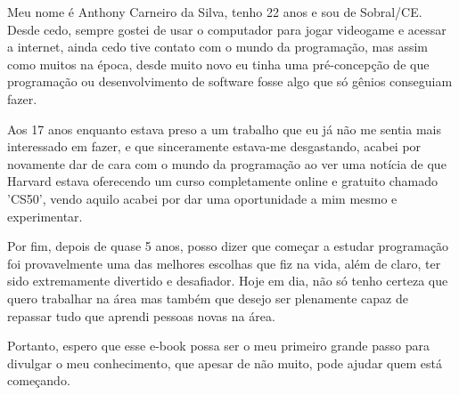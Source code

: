 
Meu nome é Anthony Carneiro da Silva, tenho 22 anos e sou de 
Sobral/CE. Desde cedo, sempre gostei de usar o computador para jogar 
videogame e acessar a internet, ainda cedo tive contato com o mundo 
da programação, mas assim como muitos na época, desde muito novo eu tinha 
uma pré-concepção de que programação ou desenvolvimento de software fosse 
algo que só gênios conseguiam fazer.

Aos 17 anos enquanto estava preso a um trabalho que eu já não me sentia 
mais interessado em fazer, e que sinceramente estava-me desgastando, acabei 
por novamente dar de cara com o mundo da programação ao ver uma notícia de 
que Harvard estava oferecendo um curso completamente online e gratuito 
chamado 'CS50', vendo aquilo acabei por dar uma oportunidade a mim mesmo e 
experimentar.

Por fim, depois de quase 5 anos, posso dizer que começar a 
estudar programação foi provavelmente uma das melhores escolhas que fiz 
na vida, além de claro, ter sido extremamente divertido e desafiador. 
Hoje em dia, não só tenho certeza que quero trabalhar na área mas 
também que desejo ser plenamente capaz de repassar tudo que aprendi 
pessoas novas na área.

Portanto, espero que esse e-book possa ser o meu primeiro 
grande passo para divulgar o meu conhecimento, que apesar de não muito, 
pode ajudar quem está começando.

